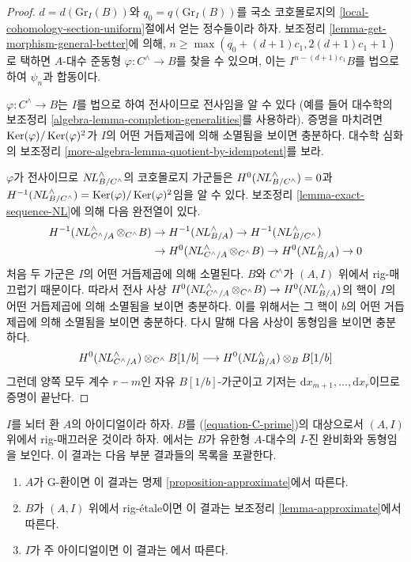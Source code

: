 \begin{proof}
\medskip\noindent
$d = d(\text{Gr}_I(B))$와 $q_0 = q(\text{Gr}_I(B))$를
국소 코호몰로지의 \ref{local-cohomology-section-uniform}절에서 얻는 정수들이라 하자.
보조정리 \ref{lemma-get-morphism-general-better}에 의해,
$n \geq \max(q_0 + (d + 1)c_1, 2(d + 1)c_1 + 1)$로 택하면
$A$-대수 준동형 $\varphi : C^\wedge \to B$를 찾을 수 있으며,
이는 $I^{n - (d + 1)c_1}B$를 법으로 하여 $\psi_n$과 합동이다.

\medskip\noindent
$\varphi : C^\wedge \to B$는 $I$를 법으로 하여 전사이므로 전사임을 알 수 있다
(예를 들어 대수학의 보조정리 \ref{algebra-lemma-completion-generalities}를 사용하라).
증명을 마치려면 $\mathop{\mathrm{Ker}}(\varphi)/\mathop{\mathrm{Ker}}(\varphi)^2$가
$I$의 어떤 거듭제곱에 의해 소멸됨을 보이면 충분하다.
대수학 심화의 보조정리 \ref{more-algebra-lemma-quotient-by-idempotent}를 보라.

\medskip\noindent
$\varphi$가 전사이므로 $\mathop{N\!L}\nolimits_{B/C^{\wedge}}^\wedge$의 코호몰로지 가군들은
$H^0(\mathop{N\!L}\nolimits_{B/C^{\wedge}}^\wedge) = 0$과
$H^{-1}(\mathop{N\!L}\nolimits_{B/C^{\wedge}}^\wedge) = \mathop{\mathrm{Ker}}(\varphi)/\mathop{\mathrm{Ker}}(\varphi)^2$임을 알 수 있다.
보조정리 \ref{lemma-exact-sequence-NL}에 의해 다음 완전열이 있다.
$$
\begin{aligned}
H^{-1}(\mathop{N\!L}\nolimits_{C^\wedge/A}^\wedge \otimes_{C^\wedge} B) &\to
H^{-1}(\mathop{N\!L}\nolimits_{B/A}^\wedge) \to
H^{-1}(\mathop{N\!L}\nolimits_{B/C^{\wedge}}^\wedge) \\
&\to H^0(\mathop{N\!L}\nolimits_{C^\wedge/A}^\wedge \otimes_{C^\wedge} B) \to
H^0(\mathop{N\!L}\nolimits_{B/A}^\wedge) \to 0
\end{aligned}
$$
처음 두 가군은 $I$의 어떤 거듭제곱에 의해 소멸된다.
$B$와 $C^\wedge$가 $(A, I)$ 위에서 rig-매끄럽기 때문이다.
따라서 전사 사상
$H^0(\mathop{N\!L}\nolimits_{C^\wedge/A}^\wedge \otimes_{C^\wedge} B) \to
H^0(\mathop{N\!L}\nolimits_{B/A}^\wedge)$의 핵이 $I$의 어떤 거듭제곱에 의해 소멸됨을 보이면 충분하다.
이를 위해서는 그 핵이 $b$의 어떤 거듭제곱에 의해 소멸됨을 보이면 충분하다.
다시 말해 다음 사상이 동형임을 보이면 충분하다.
$$
H^0(\mathop{N\!L}\nolimits_{C^\wedge/A}^\wedge) \otimes_{C^\wedge} B[1/b]
\longrightarrow
H^0(\mathop{N\!L}\nolimits_{B/A}^\wedge) \otimes_B B[1/b]
$$
그런데 양쪽 모두 계수 $r - m$인 자유 $B[1/b]$-가군이고
기저는 $\text{d}x_{m + 1}, \ldots, \text{d}x_r$이므로 증명이 끝난다.
\end{proof}

\begin{remark}
\label{remark-discussion}
$I$를 뇌터 환 $A$의 아이디얼이라 하자.
$B$를 (\ref{equation-C-prime})의 대상으로서 $(A, I)$ 위에서 rig-매끄러운 것이라 하자.
\cite[Theorem 1.2]{gabber-zavyalov}에서는 $B$가 유한형 $A$-대수의
$I$-진 완비화와 동형임을 보인다.
이 결과는 다음 부분 결과들의 목록을 포괄한다.
\begin{enumerate}
\item $A$가 G-환이면 이 결과는 명제 \ref{proposition-approximate}에서 따른다.
\item $B$가 $(A, I)$ 위에서 rig-\'etale이면 이 결과는 보조정리 \ref{lemma-approximate}에서 따른다.
\item $I$가 주 아이디얼이면 이 결과는 \cite[III Theorem 7]{Elkik}에서 따른다.
\end{enumerate}
\end{remark}


